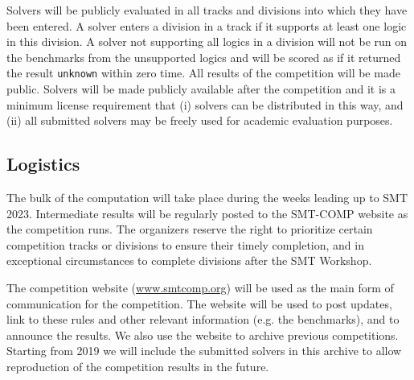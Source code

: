 \documentclass[12pt]{article}
\newcommand{\rem}[1]{\textcolor{red}{[#1]}}
\newcommand{\an}[1]{\rem{#1 -- aina}}
\begin{document}
Solvers will be publicly evaluated in all tracks and divisions into
which they have been entered.
%
A solver enters a division in a track if it supports at least one
logic in this division.
%
A solver not supporting all logics in a division will not be run on
the benchmarks from the unsupported logics and will be scored as if it
returned the result \texttt{unknown} within zero time.
%
All results of the competition will be made public. Solvers will be
made publicly available after the competition and it is a minimum
license requirement that (i) solvers can be distributed in this way,
and (ii) all submitted solvers may be freely used for academic
evaluation purposes.



\subsection{Logistics}
\label{sec:logistics}

%
The bulk of the computation will take place during the weeks leading
up to SMT 2023.  Intermediate results will be regularly posted to the
SMT-COMP website as the competition runs.
%
The organizers reserve the right to prioritize certain competition
tracks or divisions to ensure their timely completion, and in
exceptional circumstances to complete divisions after the SMT
Workshop.


The competition website (\url{www.smtcomp.org}) will be used as the main form
of communication for the competition. The website will be used to post updates,
link to these rules and other relevant information (e.g. the benchmarks), and
to announce the results. We also use the website to archive previous
competitions. Starting from 2019 we will include the submitted solvers in this
archive to allow reproduction of the competition results in the future.
%
\end{document}
